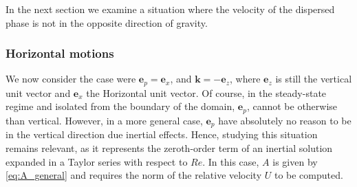 In the next section we examine a situation where the velocity of the dispersed phase is not in the opposite direction of gravity. 



\subsubsection{Horizontal motions}

We now consider the case were $\textbf{e}_p = \textbf{e}_x$, and $\textbf{k} = - \textbf{e}_z$, where $\textbf{e}_z$ is still the vertical unit vector and $\textbf{e}_x$ the Horizontal unit vector. 
Of course, in the steady-state regime and isolated from the boundary of the domain, $\textbf{e}_p$, cannot be otherwise than vertical.  
However, in a more general case, $\textbf{e}_p$ have absolutely no reason to be in the vertical direction due inertial effects.
Hence, studying this situation remains relevant, as it represents the zeroth-order term of an inertial solution expanded in a Taylor series with respect to $Re$.  
In this case, $A$ is given by \ref{eq:A_general} and requires the norm of the relative velocity $U$ to be computed.

